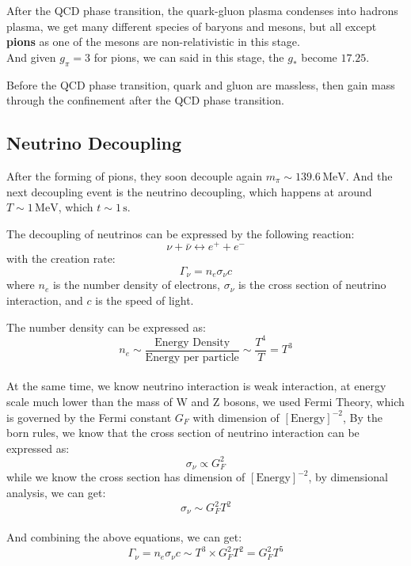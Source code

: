 After the QCD phase transition, the quark-gluon plasma condenses into hadrons plasma, we get many different species of baryons and mesons, but all except \textbf{pions} as one of the mesons are non-relativistic in this stage. \\

And given $g_\pi = 3$ for pions, we can said in this stage, the $g_*$ become $17.25$. \\

\begin{remark}
    Before the QCD phase transition, quark and gluon are massless, then gain mass through the confinement after the QCD phase transition.
\end{remark}


\bigskip\noindent \bigskip\noindent  \bigskip\noindent 
\subsection{Neutrino Decoupling}
After the forming of pions, they soon decouple again $m_\pi \sim 139.6\,\mathrm{MeV}$. And the next decoupling event is the neutrino decoupling, which happens at around $T \sim 1\,\mathrm{MeV}$, which $t \sim 1\,\mathrm{s}$. \\

\begin{theory}
    The decoupling of neutrinos can be expressed by the following reaction:
    \[
        \nu + \bar{\nu} \leftrightarrow e^+ + e^-
    \]
    with the creation rate:
    \[
        \Gamma_\nu = n_e \sigma_\nu c
    \]
    where $n_e$ is the number density of electrons, $\sigma_\nu$ is the cross section of neutrino interaction, and $c$ is the speed of light. \\
\end{theory}


\bigskip\noindent
\begin{foundation}
    The number density can be expressed as:
    \[
        n_e \sim \frac{\text{Energy Density}}{\text{Energy per particle}} \sim \frac{T^4}{T} = T^3
    \]\\

    At the same time, we know neutrino interaction is weak interaction, at energy scale much lower than the mass of W and Z bosons, we used Fermi Theory, which is governed by the Fermi constant $G_F$ with dimension of $[\text{Energy}]^{-2}$, By the born rules, we know that the cross section of neutrino interaction can be expressed as:
    \[
        \sigma_\nu \propto G_F^2
    \] 
    while we know the cross section has dimension of $[\text{Energy}]^{-2}$, by dimensional analysis, we can get:
    \[
        \sigma_\nu \sim G_F^2 T^2
    \] \\

    And combining the above equations, we can get:
    \[
        \Gamma_\nu = n_e \sigma_\nu c \sim T^3 \times G_F^2 T^2 = G_F^2 T^5
    \]
\end{foundation}

